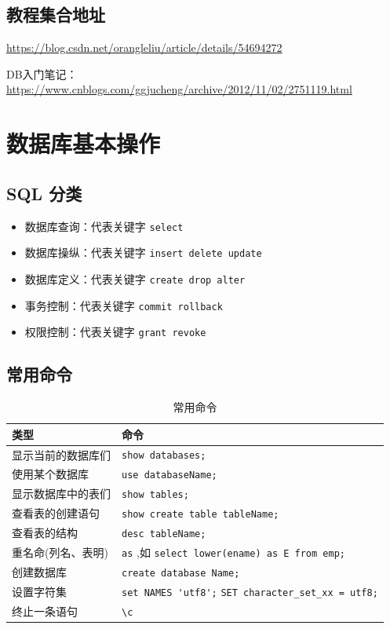 \documentclass[UTF8,a4paper,12pt]{ctexbook}
\begin{document}
				
	 \section{教程集合地址}
	 	\url{https://blog.csdn.net/orangleliu/article/details/54694272}
	 	
	 	DB入门笔记：\url{https://www.cnblogs.com/ggjucheng/archive/2012/11/02/2751119.html}
	 	
\chapter{数据库基本操作}
	\section{SQL 分类}
		\begin{itemize}
			\item 数据库查询：代表关键字 \verb|select|
			\item 数据库操纵：代表关键字 \verb|insert delete update|
			\item 数据库定义：代表关键字 \verb|create drop alter|
			\item 事务控制：代表关键字 \verb|commit rollback|
			\item 权限控制：代表关键字 \verb|grant revoke|
		\end{itemize} 
	
	\section{常用命令}
		\begin{table}[H]
			\centering
			\caption{常用命令}
			\begin{tabular}{p{4cm}<{\centering}|p{11cm}<{\centering}}
				\hline
					类型  & 命令 \\
				\hline
					显示当前的数据库们  & \verb|show databases;| \\
					使用某个数据库	& 	\verb|use databaseName;| \\
					显示数据库中的表们	& \verb|show tables;|	\\
					查看表的创建语句	& \verb|show create table tableName;|	\\
					查看表的结构	& \verb|desc tableName;|	\\
					重名命(列名、表明)	& \verb|as| ,如 \verb|select lower(ename) as E from emp;|	\\
					创建数据库	& \verb|create database Name;|	\\
					设置字符集	& \verb|set NAMES 'utf8';| \verb|SET character_set_xx = utf8;|	\\
					终止一条语句	& \verb|\c|	\\
				\hline
			\end{tabular}
		\end{table}
\end{document}

